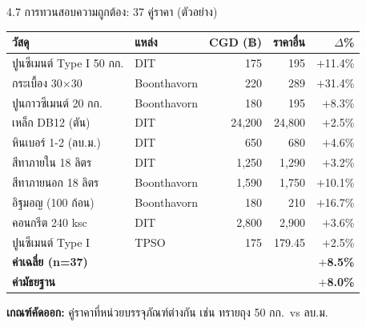 \documentclass[aspectratio=169,11pt]{beamer}
\begin{document}
\begin{frame}{4.7 การทวนสอบความถูกต้อง: 37 คู่ราคา (ตัวอย่าง)}
  \scriptsize
  \begin{table}
    \centering
    \begin{tabular}{llrrr}
      \toprule
      \textbf{วัสดุ} & \textbf{แหล่ง} & \textbf{CGD (฿)} & \textbf{ราคาอื่น} & \textbf{$\Delta$\%} \\
      \midrule
      ปูนซีเมนต์ Type I 50 กก. & DIT          & 175      & 195       & $+$11.4\% \\
      กระเบื้อง 30$\times$30   & Boonthavorn  & 220      & 289       & $+$31.4\% \\
      ปูนกาวซีเมนต์ 20 กก.    & Boonthavorn  & 180      & 195       & $+$8.3\% \\
      เหล็ก DB12 (ตัน)         & DIT          & 24{,}200 & 24{,}800  & $+$2.5\% \\
      หินเบอร์ 1-2 (ลบ.ม.)     & DIT          & 650      & 680       & $+$4.6\% \\
      สีทาภายใน 18 ลิตร        & DIT          & 1{,}250  & 1{,}290   & $+$3.2\% \\
      สีทาภายนอก 18 ลิตร       & Boonthavorn  & 1{,}590  & 1{,}750   & $+$10.1\% \\
      อิฐมอญ (100 ก้อน)        & Boonthavorn  & 180      & 210       & $+$16.7\% \\
      คอนกรีต 240 ksc          & DIT          & 2{,}800  & 2{,}900   & $+$3.6\% \\
      ปูนซีเมนต์ Type I        & TPSO         & 175      & 179.45    & $+$2.5\% \\
      \midrule
      \multicolumn{4}{l}{\textbf{ค่าเฉลี่ย (n=37)}} & \textbf{$+$8.5\%} \\
      \multicolumn{4}{l}{\textbf{ค่ามัธยฐาน}} & \textbf{$+$8.0\%} \\
      \bottomrule
    \end{tabular}
  \end{table}
  \vspace{0.3em}
  \footnotesize\textbf{เกณฑ์คัดออก:} คู่ราคาที่หน่วยบรรจุภัณฑ์ต่างกัน
  เช่น ทรายถุง 50 กก.\ vs ลบ.ม.
\end{frame}
\end{document}
